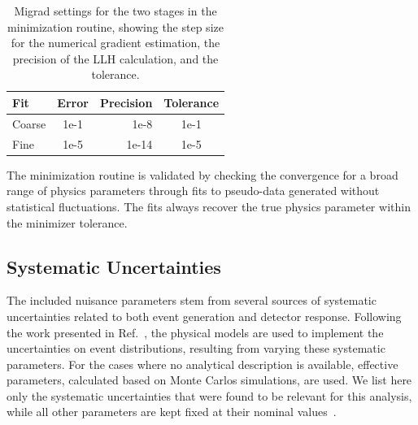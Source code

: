 \documentclass[
    aps,
    prd,
    reprint,
    amsmath,
    amssymb,
    nofootinbib,
    superscriptaddress,
    floatfix
]{revtex4-2}
\providecommand{\DIFdelbeginFL}{} %
\providecommand{\DIFdelendFL}{} %
\newcommand{\DIFscaledelfig}{0.5}
\newlength{\DIFdelgraphicswidth} %
\newlength{\DIFdelgraphicsheight} %
\newcommand{\DIFdelincludegraphics}[2][]{%
\sbox{\DIFdelgraphicsbox}{\DIFOincludegraphics[#1]{#2}}%
\settoboxwidth{\DIFdelgraphicswidth}{\DIFdelgraphicsbox} %
\settoboxtotalheight{\DIFdelgraphicsheight}{\DIFdelgraphicsbox} %
\scalebox{\DIFscaledelfig}{%
\parbox[b]{\DIFdelgraphicswidth}{\usebox{\DIFdelgraphicsbox}\\[-\baselineskip] \rule{\DIFdelgraphicswidth}{0em}}\llap{\resizebox{\DIFdelgraphicswidth}{\DIFdelgraphicsheight}{%
\setlength{\unitlength}{\DIFdelgraphicswidth}%
\begin{picture}(1,1)%
\thicklines\linethickness{2pt} %
{\color[rgb]{1,0,0}\put(0,0){\framebox(1,1){}}}%
{\color[rgb]{1,0,0}\put(0,0){\line( 1,1){1}}}%
{\color[rgb]{1,0,0}\put(0,1){\line(1,-1){1}}}%
\end{picture}%
}\hspace*{3pt}}} %
} %
\DeclareRobustCommand{\DIFdelbeginFL}{\DIFOdelbeginFL \let\includegraphics\DIFdelincludegraphics} %
\DeclareRobustCommand{\DIFdelendFL}{\DIFOaddendFL \let\includegraphics\DIFOincludegraphics} %
\begin{document}
\begin{table}[h]
        \begin{tabular}{ lcrc }
        \hline\hline
        \textbf{Fit} & \textbf{Error} & \textbf{Precision} & \textbf{Tolerance} \\
        \hline\hline
        Coarse & 1e-1 & 1e-8 & 1e-1 \\
        Fine & 1e-5 & 1e-14 & 1e-5 \\
        \hline
        \end{tabular}
    \DIFdelbeginFL %
\DIFdelendFL \caption{Migrad settings for the two stages in the minimization routine, showing the step size for the numerical gradient estimation, the precision of the LLH calculation, and the tolerance.}
    \label{tab:minimization_settings}
\end{table}

The minimization routine is validated by checking the convergence for a broad range of physics parameters through fits to pseudo-data generated without statistical fluctuations.
The fits always recover the true physics parameter within the minimizer tolerance.


\subsection{\label{sec:uncertainties} Systematic Uncertainties}

The included nuisance parameters stem from several sources of systematic uncertainties related to both event generation and detector response. Following the work presented in Ref.~\cite{IceCubeCollaboration:2023wtb}, the physical models are used to implement the uncertainties on event distributions, resulting from varying these systematic parameters. For the cases where no analytical description is available, effective parameters, calculated based on Monte Carlos simulations, are used. We list here only the systematic uncertainties that were found to be relevant for this analysis, while all other parameters are kept fixed at their nominal values~\cite{Fischer_2023}.
\end{document}
